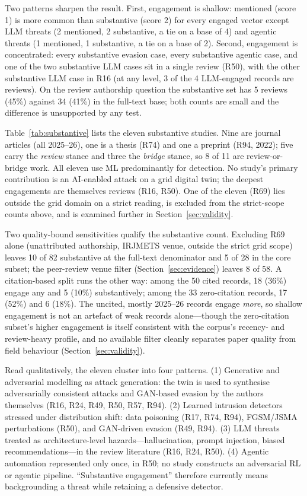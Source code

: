 \documentclass[preprint,12pt]{elsarticle}
\renewcommand{\_}{\plainunderscore\allowbreak}
\begin{document}
Two patterns sharpen the result. First, engagement is shallow: mentioned (score 1) is more
common than substantive (score 2) for every engaged vector except LLM threats (2 mentioned,
2 substantive, a tie on a base of 4) and agentic threats (1 mentioned, 1 substantive, a tie
on a base of 2). Second, engagement is concentrated: every substantive evasion case, every
substantive agentic case, and one of the two substantive LLM cases sit in a single review
(R50), with the other substantive LLM case in R16 (at any level, 3 of the 4
LLM-engaged records are reviews). On the review authorship
question the substantive set has 5 reviews (45\%) against 34 (41\%) in the full-text base;
both counts are small and the difference is unsupported by any test.

Table~\ref{tab:substantive} lists the eleven substantive studies. Nine are journal
articles (all 2025--26), one is a thesis (R74) and one a preprint (R94, 2022); five carry
the \emph{review} stance and three the \emph{bridge} stance, so 8 of 11 are review-or-bridge
work.
All eleven use ML predominantly for detection. No study's primary contribution is an
AI-enabled attack on a grid digital twin; the deepest engagements are themselves reviews
(R16, R50). One of the eleven (R69) lies outside the grid domain on a strict reading, is
excluded from the strict-scope counts above, and is examined further in
Section~\ref{sec:validity}.

Two quality-bound sensitivities qualify the substantive count. Excluding R69 alone
(unattributed authorship, IRJMETS venue, outside the strict grid scope) leaves 10 of 82
substantive at the full-text denominator and 5 of 28 in the core subset; the peer-review
venue filter (Section~\ref{sec:evidence}) leaves 8 of 58. A citation-based split runs the
other way: among the 50 cited records, 18 (36\%) engage any and 5 (10\%) substantively;
among the 33 zero-citation records, 17 (52\%) and 6 (18\%). The uncited, mostly 2025--26
records engage \emph{more}, so shallow engagement is not an artefact of weak records
alone---though the zero-citation subset's higher engagement is itself consistent with the
corpus's recency- and review-heavy profile, and no available filter cleanly separates
paper quality from field behaviour (Section~\ref{sec:validity}).

Read qualitatively, the eleven cluster into four patterns. (1) Generative and adversarial modelling as
attack generation: the twin is used to synthesise adversarially consistent attacks and GAN-based
evasion by the authors themselves (R16, R24, R49, R50, R57, R94). (2) Learned intrusion
detectors stressed under distribution shift: data poisoning (R17, R74, R94), FGSM/JSMA
perturbations (R50), and GAN-driven evasion (R49, R94). (3) LLM threats treated
as architecture-level hazards---hallucination, prompt injection, biased recommendations---in the
review literature (R16, R24, R50). (4) Agentic automation represented only once, in
R50; no study constructs an adversarial RL or agentic pipeline. ``Substantive engagement'' therefore currently means
backgrounding a threat while retaining a defensive detector.
\end{document}
